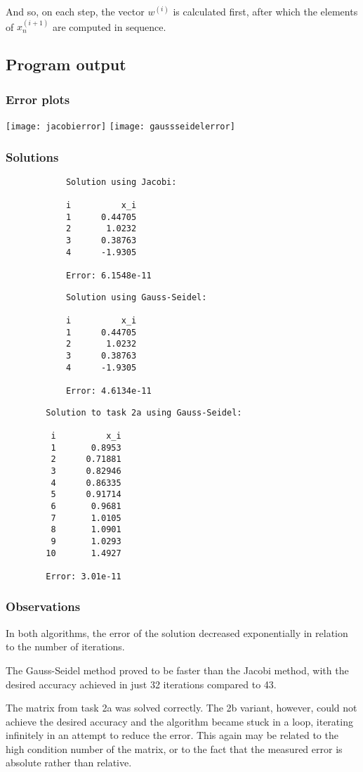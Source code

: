 \documentclass{article}
\begin{document}
	And so, on each step, the vector $w^{(i)}$ is calculated first, after which
	the elements of $x_n^{(i + 1)}$ are computed in sequence.
	
	\subsection{Program output}
	
	\subsubsection{Error plots}
	
	\texttt{[image: jacobierror]}
	\texttt{[image: gaussseidelerror]}
	
	\subsubsection{Solutions}
	
	\begin{multicols}{2}
		\begin{verbatim}
			Solution using Jacobi:

			i          x_i
			1      0.44705
			2       1.0232
			3      0.38763
			4      -1.9305

			Error: 6.1548e-11
		\end{verbatim}
		\begin{verbatim}
			Solution using Gauss-Seidel:

			i          x_i
			1      0.44705
			2       1.0232
			3      0.38763
			4      -1.9305

			Error: 4.6134e-11
		\end{verbatim}
	\end{multicols}
	
	\begin{verbatim}
		Solution to task 2a using Gauss-Seidel:
		
		 i          x_i
		 1       0.8953
		 2      0.71881
		 3      0.82946
		 4      0.86335
		 5      0.91714
		 6       0.9681
		 7       1.0105
		 8       1.0901
		 9       1.0293
		10       1.4927

		Error: 3.01e-11
	\end{verbatim}
	
	\subsubsection{Observations}
	
	In both algorithms, the error of the solution decreased exponentially in
	relation to the number of iterations.
	
	The Gauss-Seidel method proved to be faster than the Jacobi method, with the
	desired accuracy achieved in just 32 iterations compared to 43.
	
	The matrix from task 2a was solved correctly. The 2b variant, however, could
	not achieve the desired accuracy and the algorithm became stuck in a
	loop, iterating infinitely in an attempt to reduce the error. This again
	may be related to the high condition number of the matrix, or to the fact
	that the measured error is absolute rather than relative.
	
\end{document}
